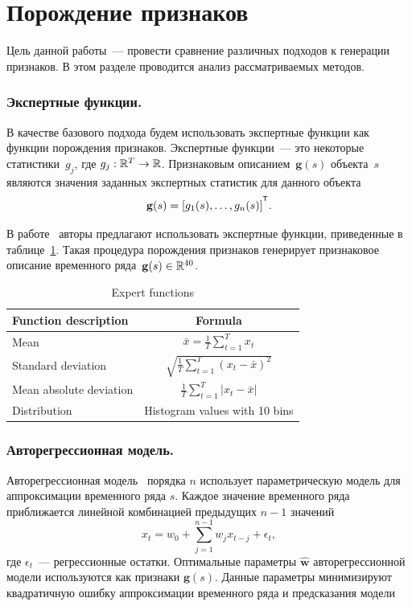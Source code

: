 \section{Порождение признаков}

Цель данной работы~--- провести сравнение различных подходов к генерации признаков.
В этом разделе проводится анализ рассматриваемых методов.

\subsubsection{Экспертные функции.}
В качестве базового подхода будем использовать экспертные функции как функции порождения признаков.
Экспертные функции~--- это некоторые статистики~$g_j$, где $g_j: \mathbb{R}^T \rightarrow \mathbb{R}$.
Признаковым описанием~$\mathbf{g}(s)$ объекта~$s$ являются значения заданных экспертных статистик для данного объекта
\[
\mathbf{g}(s) = [g_1(s), \dots, g_n(s)]^{\T}.
\]

В работе~\cite{kwapisz2011activity} авторы предлагают использовать экспертные функции, приведенные в таблице~\ref{tbl::expert_functions}.
Такая процедура порождения признаков генерирует признаковое описание временного ряда~$\mathbf{g}(s) \in \mathbb{R}^{40}$.

\begin{table}[ht]
	\centering
	\caption{Expert functions}
	\begin{tabular}{|l|c|}
		\hline
		\textbf{Function description}    & \textbf{Formula} \\ \hline
		Mean                    & $\bar{x} = \frac{1}{T} \sum_{t=1}^{T} x_t$    \\ \hline
		Standard deviation      & $\sqrt{\frac{1}{T} \sum_{t=1}^{T} (x_t - \bar{x})^2}$    \\ \hline
		Mean absolute deviation & $\frac{1}{T} \sum_{t=1}^{T} |x_t - \bar{x}|$    \\ \hline
		Distribution            &  Histogram values with 10 bins    \\ \hline
	\end{tabular}
	\label{tbl::expert_functions}
\end{table}

\subsubsection{Авторегрессионная модель.}
Авторегрессионная модель~\cite{lukashin2003adaptive} порядка $n$
использует параметрическую модель для аппроксимации временного ряда $s$. 
Каждое значение временного ряда приближается линейной комбинацией предыдущих $n-1$ значений
\begin{equation*}
x_t = w_0 + \sum_{j=1}^{n-1} w_j x_{t-j} + \epsilon_t,
\end{equation*}
где $\epsilon_t$~--- регрессионные остатки.
Оптимальные параметры $\hat{\mathbf{w}}$ авторегрессионной модели используются как признаки $\mathbf{g}(s)$.
Данные параметры минимизируют квадратичную ошибку аппроксимации временного ряда и предсказания модели

